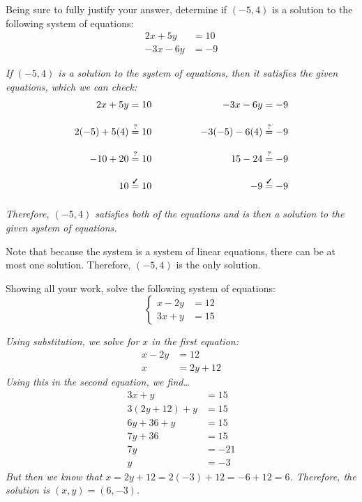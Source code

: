 \documentclass[12pt,letterpaper]{exam}
\begin{document}
\begin{questions}
\newpage
\question[6] Being sure to fully justify your answer, determine if $(-5, 4)$ is a solution to the following system of equations:
	\[
	\begin{aligned}
	2x + 5y&= 10 \\
	-3x - 6y&= -9
	\end{aligned}
	\] \pspace

{\itshape If $(-5, 4)$ is a solution to the system of equations, then it satisfies the given equations, which we can check:
	\[
	\begin{aligned}
	2x + 5y&= 10 &\qquad\qquad -3x - 6y&= -9 \\[0.3cm]
	2(-5) + 5(4)&\stackrel{?}{=} 10 &\qquad\qquad -3(-5) - 6(4)&\stackrel{?}{=} -9 \\[0.3cm]
	-10 + 20&\stackrel{?}{=} 10 &\qquad\qquad 15 - 24&\stackrel{?}{=} -9 \\[0.3cm]
	10&\stackrel{\text{\cmark}}{=} 10 &\qquad\qquad -9&\stackrel{\text{\cmark}}{=} -9 \\[0.3cm]
	\end{aligned}
	\]
Therefore, $(-5, 4)$ satisfies both of the equations and is then a solution to the given system of equations. \pspace

Note that because the system is a system of linear equations, there can be at most one solution. Therefore, $(-5, 4)$ is the only solution. 
}



\newpage
\question[6] Showing all your work, solve the following system of equations:
	\[
	\left\{
	\begin{aligned}
	x - 2y&= 12 \\
	3x + y&= 15
	\end{aligned}\right.
	\] \pspace

{\itshape Using substitution, we solve for $x$ in the first equation:
	\[
	\begin{aligned}
	x - 2y&= 12 \\
	x&= 2y + 12
	\end{aligned}
	\] 
Using this in the second equation, we find\dots
	\[
	\begin{aligned}
	3x + y&= 15 \\
	3(2y + 12) + y&= 15 \\
	6y + 36 + y&= 15 \\
	7y + 36&= 15 \\
	7y&= -21 \\
	y&= -3
	\end{aligned}
	\] 
But then we know that $x= 2y + 12= 2(-3) + 12= -6 + 12= 6$. Therefore, the solution is $(x, y)= (6, -3)$. 
	
}
\end{questions}
\end{document}
